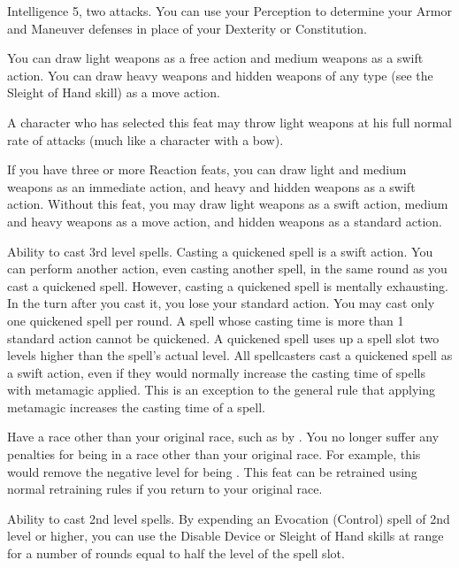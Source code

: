 \featpres Intelligence 5, two attacks.
\featben You can use your Perception to determine your Armor and Maneuver defenses in place of your Dexterity or Constitution.

\featben You can draw light weapons as a free action and medium weapons as a swift action.
You can draw heavy weapons and hidden weapons of any type (see the Sleight of Hand skill) as a move action.
\par A character who has selected this feat may throw light weapons at his full normal rate of attacks (much like a character with a bow).

If you have three or more Reaction feats, you can draw light and medium weapons as an immediate action, and heavy and hidden weapons as a swift action.
Without this feat, you may draw light weapons as a swift action, medium and heavy weapons as a move action, and hidden weapons as a standard action.

\label{Quicken Spell}
\featpre Ability to cast 3rd level spells.
\featben Casting a quickened spell is a swift action.
You can perform another action, even casting another spell, in the same round as you cast a quickened spell.
However, casting a quickened spell is mentally exhausting.
In the turn after you cast it, you lose your standard action.
You may cast only one quickened spell per round.
A spell whose casting time is more than 1 standard action cannot be quickened.
A quickened spell uses up a spell slot two levels higher than the spell's actual level.
All spellcasters cast a quickened spell as a swift action, even if they would normally increase the casting time of spells with metamagic applied.
This is an exception to the general rule that applying metamagic increases the casting time of a spell.

\label{Racial Acclimation}
\featpre Have a race other than your original race, such as by .
\featben You no longer suffer any penalties for being in a race other than your original race.
For example, this would remove the negative level for being .
This feat can be retrained using normal retraining rules if you return to your original race.

\featpre Ability to cast 2nd level spells.
\featben By expending an Evocation (Control) spell of 2nd level or higher, you can use the Disable Device or Sleight of Hand skills at \rngclose range for a number of rounds equal to half the level of the spell slot.

